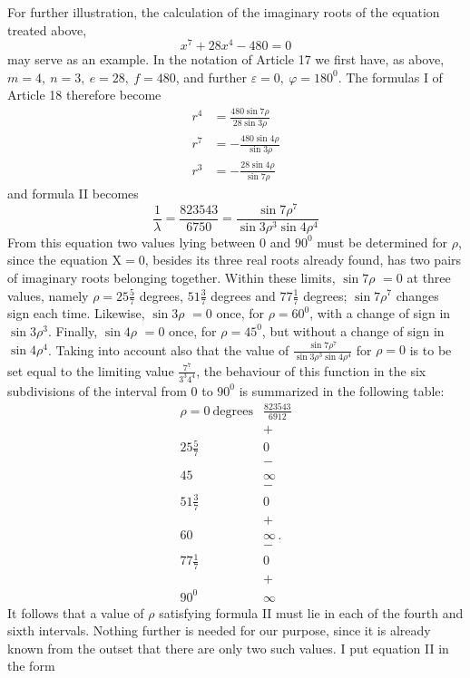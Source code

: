For further illustration, the calculation of the imaginary roots of the equation treated above,
\[
x^7+28x^4-480=0
\]
may serve as an example. In the notation of Article 17 we first have, as above, $m=4,\ n=3,\ e=28,\ f=480$, and further $\varepsilon=0,\ \varphi=180^{0}$. The formulas I of Article 18 therefore become
\[
\begin{aligned}
r^4&=\frac{480\sin7\rho}{28\sin3\rho}\\
r^7&=-\frac{480\sin4\rho}{\sin3\rho}\\
r^3&=-\frac{28\sin4\rho}{\sin7\rho}
\end{aligned}
\]
and formula II becomes
\[
\frac{1}{\lambda}=\frac{823543}{6750}=\frac{\sin7\rho^7}{\sin3\rho^3\sin4\rho^4}
\]
From this equation two values lying between $0$ and $90^{0}$ must be determined for $\rho$, since the equation $\mathrm{X}=0$, besides its three real roots already found, has two pairs of imaginary roots belonging together. Within these limits, $\sin7\rho$ $=0$ at three values, namely $\rho=25\frac57$ degrees, $51\frac37$ degrees and $77\frac17$ degrees; $\sin7\rho^7$ changes sign each time. Likewise, $\sin3\rho$ $=0$ once, for $\rho=60^{0}$, with a change of sign in $\sin3\rho^3$. Finally, $\sin4\rho$ $=0$ once, for $\rho=45^{0}$, but without a change of sign in $\sin4\rho^4$. Taking into account also that the value of $\frac{\sin7\rho^7}{\sin3\rho^3\sin4\rho^4}$ for $\rho=0$ is to be set equal to the limiting value $\frac{7^7}{3^3 4^4}$, the behaviour of this function in the six subdivisions of the interval from $0$ to $90^{0}$ is summarized in the following table:
\[
\begin{array}{c|c}
\rho=0\ \text{degrees}&\frac{823543}{6912}\\
&+\\
25\frac57&0\\
&-\\
45&\infty\\
&-\\
51\frac37&0\\
&+\\
60&\infty\,.\\
&-\\
77\frac17&0\\
&+\\
90^{0}&\infty
\end{array}
\]
It follows that a value of $\rho$ satisfying formula II must lie in each of the fourth and sixth intervals. Nothing further is needed for our purpose, since it is already known from the outset that there are only two such values. I put equation II in the form
